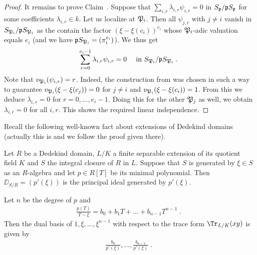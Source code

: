 \documentclass[a4paper,parskip=half,numbers=enddot, DIV=12]{scrreprt}
\begin{document}
\begin{proof}
	It remains to prove Claim~. Suppose that $\sum_{i,r}\lambda_{i,r}\psi_{i,r}=0$ in $S_{\mathfrak{p}}/\mathfrak{p} S_{\mathfrak{p}}$ for some coefficients $\lambda_{i,r}\in k$. Let us localize at $\mathfrak{P}_i$. Then all $\psi_{j,r}$ with $j\neq i$ vanish in $S_{\mathfrak{P}_i}/\mathfrak{p} S_{\mathfrak{P}_i}$ as the contain the factor $(\xi-\xi(c_i))^{e_i}$ whose $\mathfrak{P}_i$-adic valuation equals $e_i$ (and we have $\mathfrak{p} S_{\mathfrak{P}_i}=(\pi_i^{e_i})$). We thus get
	\begin{align*}
		\sum_{r=0}^{e_i-1}\lambda_{i,r}\psi_{i,r}=0\quad\text{ in }S_{\mathfrak{P}_i}/\mathfrak{p} S_{\mathfrak{P}_i}\;.
	\end{align*}
	Note that $v_{\mathfrak{P}_i}(\psi_{i,r})=r$. Indeed, the construction from  was chosen in such a way to guarantee $v_{\mathfrak{P}_i}(\xi-\xi(c_j))=0$ for $j\neq i$ and $v_{\mathfrak{P}_i}(\xi-\xi(c_i))=1$. From this we deduce $\lambda_{i,r}=0$ for $r=0,\ldots,e_i-1$. Doing this for the other $\mathfrak{P}_j$ as well, we obtain $\lambda_{i,r}=0$ for all $i,r$. This shows the required linear independence.
\end{proof}
Recall the following well-known fact about extensions of Dedekind domains (actually this is \cite[Ch.\ III, (2.4)]{NEUKIRCH} and we follow the proof given there).
\begin{prop}
	Let $R$ be a Dedekind domain, $L/K$ a finite separable extension of its quotient field $K$ and $S$ the integral closure of $R$ in $L$. Suppose that $S$ is generated by $\xi\in S$ as an $R$-algebra and let $p\in R[T]$ be its minimal polynomial. Then $\DD_{S/R}=(p'(\xi))$ is the principal ideal generated by $p'(\xi)$.
\end{prop}
\begin{lem}
	Let $n$ be the degree of $p$ and
	\begin{align*}
		\frac{p(T)}{T-\xi}=b_0+b_1T+\ldots+b_{n-1}T^{n-1}\;.
	\end{align*}
	Then the dual basis of $1,\xi,\ldots,\xi^{n-1}$ with respect to the trace form $\Tr_{L/K}(xy)$ is given by
	\begin{align*}
		\frac{b_0}{p'(\xi)},\ldots,\frac{b_{n-1}}{p'(\xi)}\;.
	\end{align*}
\end{lem}
\end{document}
